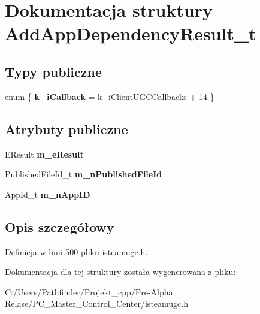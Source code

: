 \hypertarget{struct_add_app_dependency_result__t}{}\section{Dokumentacja struktury Add\+App\+Dependency\+Result\+\_\+t}
\label{struct_add_app_dependency_result__t}
\subsection*{Typy publiczne}
\begin{DoxyCompactItemize}
\item 
\mbox{\label{struct_add_app_dependency_result__t_a3bc8acfcda1e26df2b0cd91ba41980cb}} 
enum \{ {\bfseries k\+\_\+i\+Callback} = k\+\_\+i\+Client\+U\+G\+C\+Callbacks + 14
 \}
\end{DoxyCompactItemize}
\subsection*{Atrybuty publiczne}
\begin{DoxyCompactItemize}
\item 
\mbox{\label{struct_add_app_dependency_result__t_af49c0af3db6757cf53574f6667469526}} 
E\+Result {\bfseries m\+\_\+e\+Result}
\item 
\mbox{\label{struct_add_app_dependency_result__t_af83f0003b857062b663fdf67bde88bc0}} 
Published\+File\+Id\+\_\+t {\bfseries m\+\_\+n\+Published\+File\+Id}
\item 
\mbox{\label{struct_add_app_dependency_result__t_a8f8060b95760702cc39258c045f0b3ff}} 
App\+Id\+\_\+t {\bfseries m\+\_\+n\+App\+ID}
\end{DoxyCompactItemize}


\subsection{Opis szczegółowy}


Definicja w linii 500 pliku isteamugc.\+h.



Dokumentacja dla tej struktury została wygenerowana z pliku\+:\begin{DoxyCompactItemize}
\item 
C\+:/\+Users/\+Pathfinder/\+Projekt\+\_\+cpp/\+Pre-\/\+Alpha Relase/\+P\+C\+\_\+\+Master\+\_\+\+Control\+\_\+\+Center/isteamugc.\+h\end{DoxyCompactItemize}
